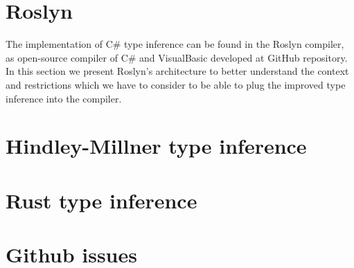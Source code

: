 \section{Roslyn}

The implementation of C\# type inference can be found in the Roslyn compiler, as open-source compiler of C\# and VisualBasic developed at GitHub repository.
In this section we present Roslyn's architecture to better understand the context and restrictions which we have to consider to be able to plug the improved type inference into the compiler.
\par
{}

\section{Hindley-Millner type inference}


\section{Rust type inference}


\section{Github issues}

